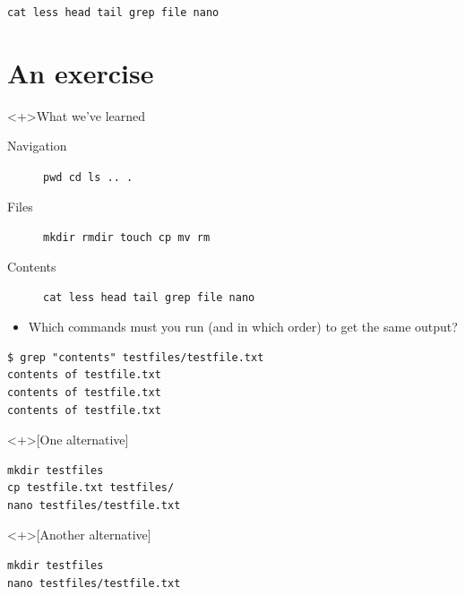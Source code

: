 \begin{frame}[fragile]
  \begin{exercise}
    \begin{center}
      \lstinline[basicstyle=\Large]{cat less head tail grep file nano}
    \end{center}
  \end{exercise}
\end{frame}


\section{An exercise}

\begin{frame}[fragile]
  \begin{block}<+>{What we've learned}
    \begin{description}
      \item[Navigation] \lstinline{pwd cd ls .. .}
      \item[Files] \lstinline{mkdir rmdir touch cp mv rm}
      \item[Contents] \lstinline{cat less head tail grep file nano}
    \end{description}
  \end{block}

  \begin{exercise}
    \begin{itemize}
      \item Which commands must you run (and in which order) to get the same 
        output?
    \end{itemize}
    \begin{lstlisting}[numbers=none]
$ grep "contents" testfiles/testfile.txt
contents of testfile.txt
contents of testfile.txt
contents of testfile.txt
    \end{lstlisting}
  \end{exercise}
\end{frame}

\begin{frame}[fragile]
  \begin{solution}<+>[One alternative]
    \begin{lstlisting}[numbers=none]
mkdir testfiles
cp testfile.txt testfiles/
nano testfiles/testfile.txt
    \end{lstlisting}
  \end{solution}
  \begin{solution}<+>[Another alternative]
    \begin{lstlisting}[numbers=none]
mkdir testfiles
nano testfiles/testfile.txt
    \end{lstlisting}
  \end{solution}
\end{frame}



